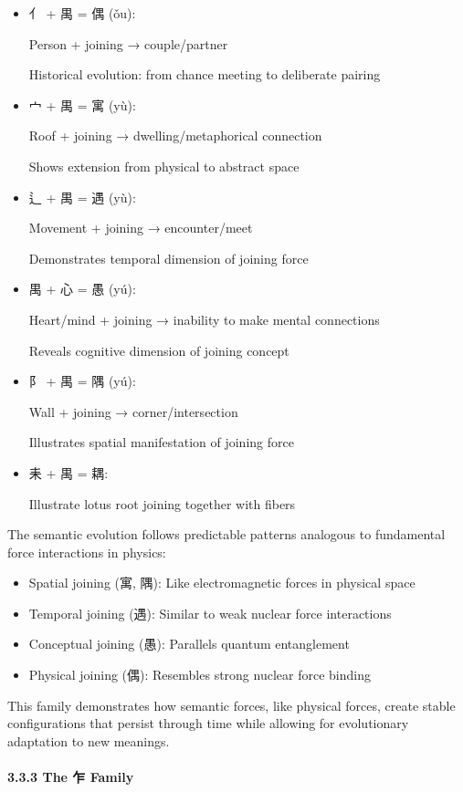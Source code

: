 \documentclass[
  11pt,
  letterpaper,
]{article}
\providecommand{\tightlist}{%
  \setlength{\itemsep}{0pt}\setlength{\parskip}{0pt}}
\begin{document}
\begin{itemize}
\item
  亻 + 禺 = 偶 (ǒu):

  Person + joining → couple/partner

  Historical evolution: from chance meeting to deliberate pairing
\item
  宀 + 禺 = 寓 (yù):

  Roof + joining → dwelling/metaphorical connection

  Shows extension from physical to abstract space
\item
  辶 + 禺 = 遇 (yù):

  Movement + joining → encounter/meet

  Demonstrates temporal dimension of joining force
\item
  禺 + 心 = 愚 (yú):

  Heart/mind + joining → inability to make mental connections

  Reveals cognitive dimension of joining concept
\item
  阝 + 禺 = 隅 (yú):

  Wall + joining → corner/intersection

  Illustrates spatial manifestation of joining force
\item
  耒 + 禺 = 耦:

  Illustrate lotus root joining together with fibers
\end{itemize}

The semantic evolution follows predictable patterns analogous to
fundamental force interactions in physics:

\begin{itemize}
\tightlist
\item
  Spatial joining (寓, 隅): Like electromagnetic forces in physical
  space
\item
  Temporal joining (遇): Similar to weak nuclear force interactions
\item
  Conceptual joining (愚): Parallels quantum entanglement
\item
  Physical joining (偶): Resembles strong nuclear force binding
\end{itemize}

This family demonstrates how semantic forces, like physical forces,
create stable configurations that persist through time while allowing
for evolutionary adaptation to new meanings.

\hypertarget{the-ux4e4d-family}{%
\paragraph{3.3.3 The 乍 Family}\label{the-ux4e4d-family}}
\end{document}
